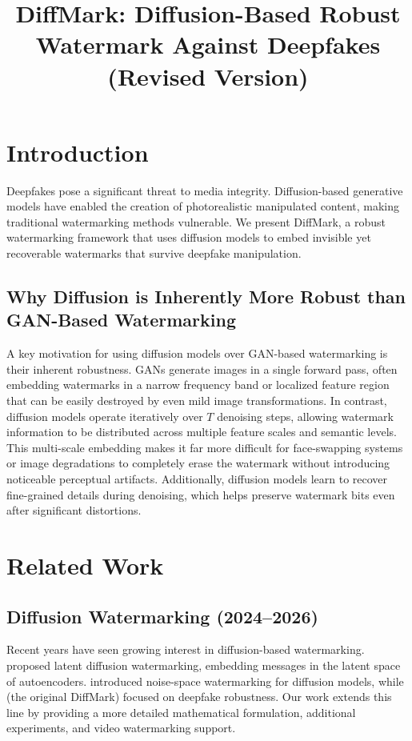 \documentclass{article}
\title{DiffMark: Diffusion-Based Robust Watermark Against Deepfakes (Revised Version)}
\author{}
\date{}
\begin{document}
\maketitle

\section{Introduction}

Deepfakes pose a significant threat to media integrity. Diffusion-based generative models have enabled the creation of photorealistic manipulated content, making traditional watermarking methods vulnerable. We present DiffMark, a robust watermarking framework that uses diffusion models to embed invisible yet recoverable watermarks that survive deepfake manipulation.

\subsection{Why Diffusion is Inherently More Robust than GAN-Based Watermarking}
A key motivation for using diffusion models over GAN-based watermarking is their inherent robustness. GANs generate images in a single forward pass, often embedding watermarks in a narrow frequency band or localized feature region that can be easily destroyed by even mild image transformations. In contrast, diffusion models operate iteratively over $T$ denoising steps, allowing watermark information to be distributed across multiple feature scales and semantic levels. This multi-scale embedding makes it far more difficult for face-swapping systems or image degradations to completely erase the watermark without introducing noticeable perceptual artifacts. Additionally, diffusion models learn to recover fine-grained details during denoising, which helps preserve watermark bits even after significant distortions.

\section{Related Work}

\subsection{Diffusion Watermarking (2024--2026)}
Recent years have seen growing interest in diffusion-based watermarking. \cite{zhang2024latent} proposed latent diffusion watermarking, embedding messages in the latent space of autoencoders. \cite{arabi2025hidden} introduced noise-space watermarking for diffusion models, while \cite{sun2025diffmark} (the original DiffMark) focused on deepfake robustness. Our work extends this line by providing a more detailed mathematical formulation, additional experiments, and video watermarking support.
\end{document}

